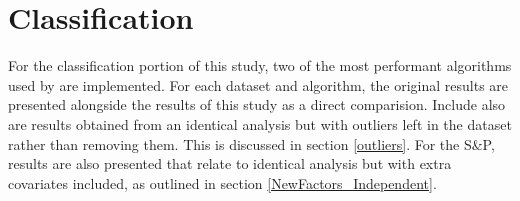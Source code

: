{\begin{table}[h!]
\end{table}
\vspace{2cm}
\begin{table}[h!]
\end{table}}
\section{Classification}\label{S.classification4}
{For the classification portion of this study, two of the most performant algorithms used by \cite{moldovan2015learning} are implemented. For each dataset and algorithm, the original results are presented alongside the results of this study as a direct comparision. Include also are results obtained from an identical analysis but with outliers left in the dataset rather than removing them. This is discussed in section \ref{outliers}. For the S\&P, results are also presented that relate to identical analysis but with extra covariates included, as outlined in section \ref{NewFactors_Independent}.   }\clearpage
